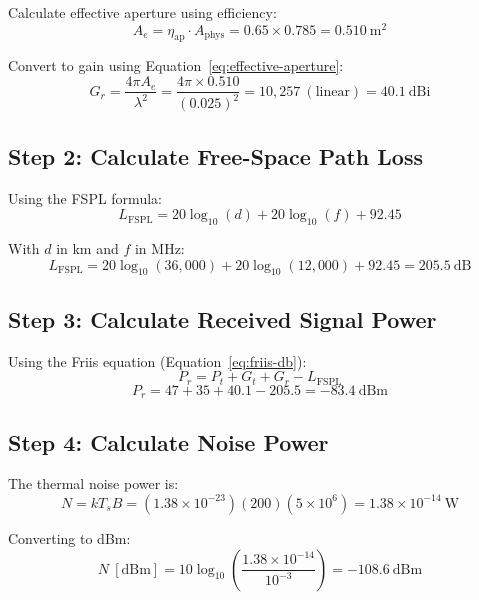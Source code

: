 Calculate effective aperture using efficiency:
\begin{equation}
A_e = \eta_{\text{ap}} \cdot A_{\text{phys}} = 0.65 \times 0.785 = 0.510\ \text{m}^2
\end{equation}

Convert to gain using Equation~\ref{eq:effective-aperture}:
\begin{equation}
G_r = \frac{4\pi A_e}{\lambda^2} = \frac{4\pi \times 0.510}{(0.025)^2} = 10{,}257\ (\text{linear}) = 40.1\ \text{dBi}
\end{equation}

\subsection*{Step 2: Calculate Free-Space Path Loss}

Using the FSPL formula:
\begin{equation}
L_{\text{FSPL}} = 20\log_{10}(d) + 20\log_{10}(f) + 92.45
\end{equation}

With $d$ in km and $f$ in MHz:
\begin{equation}
L_{\text{FSPL}} = 20\log_{10}(36{,}000) + 20\log_{10}(12{,}000) + 92.45 = 205.5\ \text{dB}
\end{equation}

\subsection*{Step 3: Calculate Received Signal Power}

Using the Friis equation (Equation~\ref{eq:friis-db}):
\begin{equation}
P_r = P_t + G_t + G_r - L_{\text{FSPL}}
\end{equation}
\begin{equation}
P_r = 47 + 35 + 40.1 - 205.5 = -83.4\ \text{dBm}
\end{equation}

\subsection*{Step 4: Calculate Noise Power}

The thermal noise power is:
\begin{equation}
N = kT_sB = (1.38 \times 10^{-23})(200)(5 \times 10^6) = 1.38 \times 10^{-14}\ \text{W}
\end{equation}

Converting to dBm:
\begin{equation}
N\ [\text{dBm}] = 10\log_{10}\left(\frac{1.38 \times 10^{-14}}{10^{-3}}\right) = -108.6\ \text{dBm}
\end{equation}

